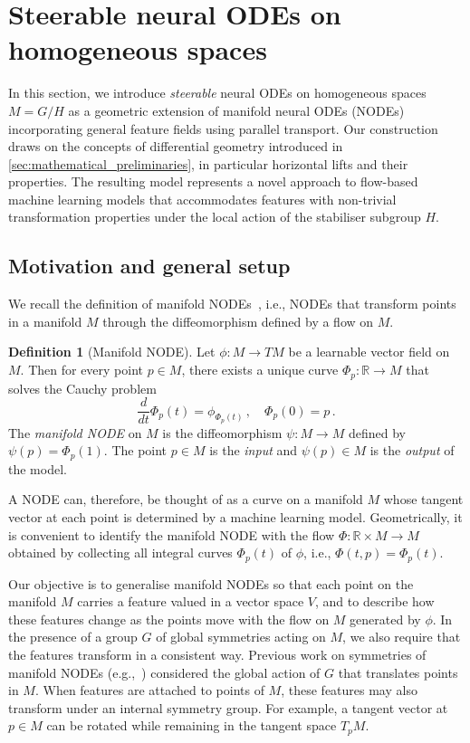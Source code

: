 \documentclass[12pt,a4paper]{article}
\numberwithin{equation}{section}
\newcommand{\R}{\mathbb{R}}
\theoremstyle{plain}
\theoremstyle{definition}
\newtheorem{definition}[theorem]{Definition}
\theoremstyle{remark}
\begin{document}
\section{Steerable neural ODEs on homogeneous spaces}\label{sec:steerable_NODEs}
In this section, we introduce \textit{steerable} neural ODEs on homogeneous spaces $M=G/H$ as a geometric extension of manifold neural ODEs (NODEs) incorporating general feature fields using parallel transport. Our construction draws on the concepts of differential geometry introduced in \cref{sec:mathematical_preliminaries}, in particular horizontal lifts and their properties. The resulting model represents a novel approach to flow-based machine learning models that accommodates features with non-trivial transformation properties under the local action of the stabiliser subgroup $H$.

\subsection{Motivation and general setup}\label{sec:motivation_and_general_setup}
We recall the definition of manifold NODEs~\cite{Falorsi2020,Lou2020,Mathieu2020}, i.e., NODEs that transform points in a manifold $M$ through the diffeomorphism defined by a flow on $M$.

\begin{definition}[Manifold NODE]\label{dfn:mfd_NODE}
    Let $\phi:M\to TM$ be a learnable vector field on $M$. Then for every point $p\in M$, there exists a unique curve $\Phi_p:\mathbb{R}\to M$ that solves the Cauchy problem
    \begin{equation}\label{eqn:mfd_NODE}
        \frac{d}{dt}{\Phi}_p(t) = \phi_{\Phi_p(t)} \,, \quad \Phi_p(0) = p \,.
    \end{equation}
    The \textit{manifold NODE} on $M$ is the diffeomorphism $\psi:M\to M$ defined by $\psi(p) = \Phi_p(1)$. The point $p\in M$ is the \textit{input} and $\psi(p)\in M$ is the \textit{output} of the model. 
\end{definition}

A NODE can, therefore, be thought of as a curve on a manifold $M$ whose tangent vector at each point is determined by a machine learning model. Geometrically, it is convenient to identify the manifold NODE with the flow $\Phi: \R \times M \to M$ obtained by collecting all integral curves $\Phi_p(t)$ of $\phi$, i.e., $\Phi(t,p)=\Phi_p(t)$.

Our objective is to generalise manifold NODEs so that each point on the manifold $M$ carries a feature valued in a vector space $V$, and to describe how these features change as the points move with the flow on $M$ generated by $\phi$. In the presence of a group $G$ of global symmetries acting on $M$, we also require that the features transform in a consistent way. Previous work on symmetries of manifold NODEs (e.g.,~\cite{Kohler2020,Katsman2021,Andersdotter2025}) considered the global action of $G$ that translates points in $M$. When features are attached to points of $M$, these features may also transform under an internal symmetry group. For example, a tangent vector at $p\in M$ can be rotated while remaining in the tangent space $T_pM$.
\end{document}
